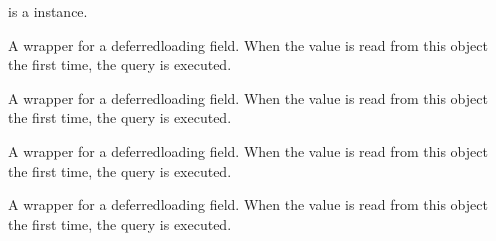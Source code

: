 \documentclass[letterpaper,10pt,spanish]{sphinxmanual}
\begin{document}
\begin{fulllineitems}
\begin{fulllineitems}
\sphinxAtStartPar
{} is a  instance.

\end{fulllineitems}



\begin{fulllineitems}

\pysigstartsignatures
{}
\pysigstopsignatures
\end{fulllineitems}



\begin{fulllineitems}

\pysigstartsignatures
{}
\pysigstopsignatures
\sphinxAtStartPar
A wrapper for a deferred\sphinxhyphen{}loading field. When the value is read from this
object the first time, the query is executed.

\end{fulllineitems}



\begin{fulllineitems}

\pysigstartsignatures
{}
\pysigstopsignatures
\sphinxAtStartPar
A wrapper for a deferred\sphinxhyphen{}loading field. When the value is read from this
object the first time, the query is executed.

\end{fulllineitems}



\begin{fulllineitems}

\pysigstartsignatures
{}
\pysigstopsignatures
\sphinxAtStartPar
A wrapper for a deferred\sphinxhyphen{}loading field. When the value is read from this
object the first time, the query is executed.

\end{fulllineitems}



\begin{fulllineitems}

\pysigstartsignatures
{}
\pysigstopsignatures
\sphinxAtStartPar
A wrapper for a deferred\sphinxhyphen{}loading field. When the value is read from this
object the first time, the query is executed.


\end{fulllineitems}
\end{fulllineitems}
\end{document}
